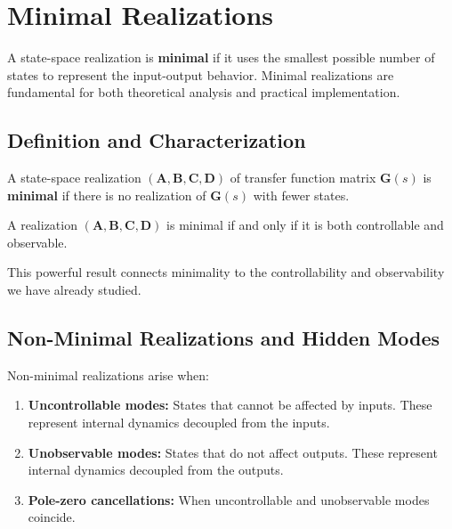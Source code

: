 \section{Minimal Realizations}
\label{sec:minimal_realizations}

A state-space realization is \textbf{minimal} if it uses the smallest possible number of states to represent the input-output behavior. Minimal realizations are fundamental for both theoretical analysis and practical implementation.

\subsection{Definition and Characterization}

\begin{definition}
A state-space realization $(\mathbf{A}, \mathbf{B}, \mathbf{C}, \mathbf{D})$ of transfer function matrix $\mathbf{G}(s)$ is \textbf{minimal} if there is no realization of $\mathbf{G}(s)$ with fewer states.
\end{definition}

\begin{theorem}
A realization $(\mathbf{A}, \mathbf{B}, \mathbf{C}, \mathbf{D})$ is minimal if and only if it is both controllable and observable.
\end{theorem}

This powerful result connects minimality to the controllability and observability we have already studied.

\subsection{Non-Minimal Realizations and Hidden Modes}

Non-minimal realizations arise when:
\begin{enumerate}
\item \textbf{Uncontrollable modes:} States that cannot be affected by inputs. These represent internal dynamics decoupled from the inputs.

\item \textbf{Unobservable modes:} States that do not affect outputs. These represent internal dynamics decoupled from the outputs.

\item \textbf{Pole-zero cancellations:} When uncontrollable and unobservable modes coincide.
\end{enumerate}

